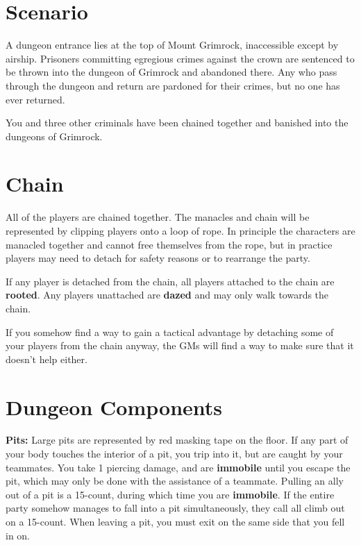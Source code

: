 \documentclass[green]{grimrock}
\begin{document}
\name{\gRules{}}

\section{Scenario}

A dungeon entrance lies at the top of Mount Grimrock, inaccessible except by airship.  Prisoners committing egregious crimes against the crown are sentenced to be thrown into the dungeon of Grimrock and abandoned there.  Any who pass through the dungeon and return are pardoned for their crimes, but no one has ever returned.

You and three other criminals have been chained together and banished into the dungeons of Grimrock.


\section{Chain}

All of the players are chained together. The manacles and chain will be represented by clipping players onto a loop of rope.  In principle the characters are manacled together and cannot free themselves from the rope, but in practice players may need to detach for safety reasons or to rearrange the party.

If any player is detached from the chain, all players attached to the chain are {\bf rooted}.  Any players unattached are {\bf dazed} and may only walk towards the chain.

If you somehow find a way to gain a tactical advantage by detaching some of your players from the chain anyway, the GMs will find a way to make sure that it doesn't help either.

\section{Dungeon Components}

{\bf Pits:}  Large pits are represented by red masking tape on the floor.  If any part of your body touches the interior of a pit, you trip into it, but are caught by your teammates.  You take 1 piercing damage, and are {\bf immobile} until you escape the pit, which may only be done with the assistance of a teammate.  Pulling an ally out of a pit is a 15-count, during which time you are {\bf immobile}. If the entire party somehow manages to fall into a pit simultaneously, they call all climb out on a 15-count. When leaving a pit, you must exit on the same side that you fell in on.
\end{document}
